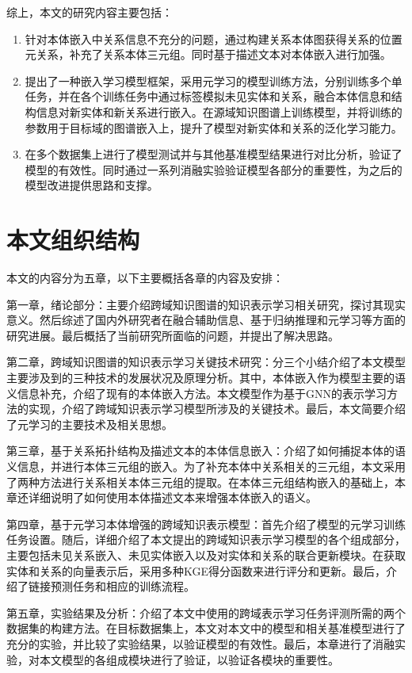 综上，本文的研究内容主要包括：
\begin{enumerate}[label=\arabic*)]
  \item 针对本体嵌入中关系信息不充分的问题，通过构建关系本体图获得关系的位置元关系，补充了关系本体三元组。同时基于描述文本对本体嵌入进行加强。

  \item 提出了一种嵌入学习模型框架，采用元学习的模型训练方法，分别训练多个单任务，并在各个训练任务中通过标签模拟未见实体和关系，融合本体信息和结构信息对新实体和新关系进行嵌入。在源域知识图谱上训练模型，并将训练的参数用于目标域的图谱嵌入上，提升了模型对新实体和关系的泛化学习能力。

  \item 在多个数据集上进行了模型测试并与其他基准模型结果进行对比分析，验证了模型的有效性。同时通过一系列消融实验验证模型各部分的重要性，为之后的模型改进提供思路和支撑。
\end{enumerate}

\section{本文组织结构}
本文的内容分为五章，以下主要概括各章的内容及安排：

第一章，绪论部分：主要介绍跨域知识图谱的知识表示学习相关研究，探讨其现实意义。然后综述了国内外研究者在融合辅助信息、基于归纳推理和元学习等方面的研究进展。最后概括了当前研究所面临的问题，并提出了解决思路。

第二章，跨域知识图谱的知识表示学习关键技术研究：分三个小结介绍了本文模型主要涉及到的三种技术的发展状况及原理分析。其中，本体嵌入作为模型主要的语义信息补充，介绍了现有的本体嵌入方法。本文模型作为基于GNN的表示学习方法的实现，介绍了跨域知识表示学习模型所涉及的关键技术。最后，本文简要介绍了元学习的主要技术及相关思想。

第三章，基于关系拓扑结构及描述文本的本体信息嵌入：介绍了如何捕捉本体的语义信息，并进行本体三元组的嵌入。为了补充本体中关系相关的三元组，本文采用了两种方法进行关系相关本体三元组的提取。在本体三元组结构嵌入的基础上，本章还详细说明了如何使用本体描述文本来增强本体嵌入的语义。

第四章，基于元学习本体增强的跨域知识表示模型：首先介绍了模型的元学习训练任务设置。随后，详细介绍了本文提出的跨域知识表示学习模型的各个组成部分，主要包括未见关系嵌入、未见实体嵌入以及对实体和关系的联合更新模块。在获取实体和关系的向量表示后，采用多种KGE得分函数来进行评分和更新。最后，介绍了链接预测任务和相应的训练流程。

第五章，实验结果及分析：介绍了本文中使用的跨域表示学习任务评测所需的两个数据集的构建方法。在目标数据集上，本文对本文中的模型和相关基准模型进行了充分的实验，并比较了实验结果，以验证模型的有效性。最后，本章进行了消融实验，对本文模型的各组成模块进行了验证，以验证各模块的重要性。

